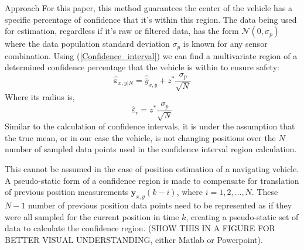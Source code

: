 \begin{section}{Approach}
For this paper, this method guarantees the center of the vehicle has a specific percentage of confidence that it's within this region. The data being used for estimation, regardless if it's raw or filtered data, has the form $\mathcal{N}(0,\sigma_p)$ where the data population standard deviation $\sigma_p$ is known for any sensor combination. Using (\ref{Confidence_interval}) we can find a multivariate region of a determined confidence percentage that the vehicle is within to ensure safety:
    \begin{equation}
    \label{Confidence_region}
		\hat{\bm{\varepsilon}}_{x,y|N} = \hat{\bar{y}}_{x,y} + z^{*}\frac{\sigma_p}{\sqrt{N}}
	\end{equation}
Where its radius is,
    \begin{equation}
		\hat{\varepsilon}_r = z^{*}\frac{\sigma_p}{\sqrt{N}}
	\end{equation}
Similar to the calculation of confidence intervals, it is under the assumption that the true mean, or in our case the vehicle, is not changing positions over the $N$ number of sampled data points used in the confidence interval region calculation.

 This cannot be assumed in the case of position estimation of a navigating vehicle. A pseudo-static form of a confidence region is made to compensate for translation of previous position measurements $\bm{y}_{x,y}(k-i)$, where $i=1,2,\dots,N$. These $N-1$ number of previous position data points need to be represented as if they were all sampled for the current position in time $k$, creating a pseudo-static set of data to calculate the confidence region. (SHOW THIS IN A FIGURE FOR BETTER VISUAL UNDERSTANDING, either Matlab or Powerpoint).


\end{section}
